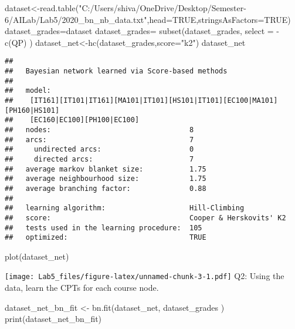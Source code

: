 \documentclass[
]{article}
\newenvironment{Shaded}{\begin{snugshade}}{\end{snugshade}}
\newcommand{\AttributeTok}[1]{\textcolor[rgb]{0.77,0.63,0.00}{#1}}
\newcommand{\ConstantTok}[1]{\textcolor[rgb]{0.00,0.00,0.00}{#1}}
\newcommand{\FunctionTok}[1]{\textcolor[rgb]{0.00,0.00,0.00}{#1}}
\newcommand{\NormalTok}[1]{#1}
\newcommand{\OtherTok}[1]{\textcolor[rgb]{0.56,0.35,0.01}{#1}}
\newcommand{\SpecialCharTok}[1]{\textcolor[rgb]{0.00,0.00,0.00}{#1}}
\newcommand{\StringTok}[1]{\textcolor[rgb]{0.31,0.60,0.02}{#1}}
\begin{document}
\begin{Shaded}
\begin{Highlighting}[]
\NormalTok{dataset}\OtherTok{\textless{}{-}}\FunctionTok{read.table}\NormalTok{(}\StringTok{"C:/Users/shiva/OneDrive/Desktop/Semester{-}6/AILab/Lab5/2020\_bn\_nb\_data.txt"}\NormalTok{,}\AttributeTok{head=}\ConstantTok{TRUE}\NormalTok{,}\AttributeTok{stringsAsFactors=}\ConstantTok{TRUE}\NormalTok{)}
\NormalTok{dataset\_grades}\OtherTok{=}\NormalTok{dataset}
\NormalTok{dataset\_grades}\OtherTok{=} \FunctionTok{subset}\NormalTok{(dataset\_grades, }\AttributeTok{select =} \SpecialCharTok{{-}}\FunctionTok{c}\NormalTok{(QP) )}
\NormalTok{dataset\_net}\OtherTok{\textless{}{-}}\FunctionTok{hc}\NormalTok{(dataset\_grades,}\AttributeTok{score=}\StringTok{"k2"}\NormalTok{)}
\NormalTok{dataset\_net}
\end{Highlighting}
\end{Shaded}

\begin{verbatim}
## 
##   Bayesian network learned via Score-based methods
## 
##   model:
##    [IT161][IT101|IT161][MA101|IT101][HS101|IT101][EC100|MA101][PH160|HS101]
##    [EC160|EC100][PH100|EC100]
##   nodes:                                 8 
##   arcs:                                  7 
##     undirected arcs:                     0 
##     directed arcs:                       7 
##   average markov blanket size:           1.75 
##   average neighbourhood size:            1.75 
##   average branching factor:              0.88 
## 
##   learning algorithm:                    Hill-Climbing 
##   score:                                 Cooper & Herskovits' K2 
##   tests used in the learning procedure:  105 
##   optimized:                             TRUE
\end{verbatim}

\begin{Shaded}
\begin{Highlighting}[]
\FunctionTok{plot}\NormalTok{(dataset\_net)}
\end{Highlighting}
\end{Shaded}

\texttt{[image: Lab5\_files/figure-latex/unnamed-chunk-3-1.pdf]} Q2:
Using the data, learn the CPTs for each course node.

\begin{Shaded}
\begin{Highlighting}[]
\NormalTok{dataset\_net\_bn\_fit }\OtherTok{\textless{}{-}} \FunctionTok{bn.fit}\NormalTok{(dataset\_net, dataset\_grades )}
\FunctionTok{print}\NormalTok{(dataset\_net\_bn\_fit)}
\end{Highlighting}
\end{Shaded}
\end{document}
